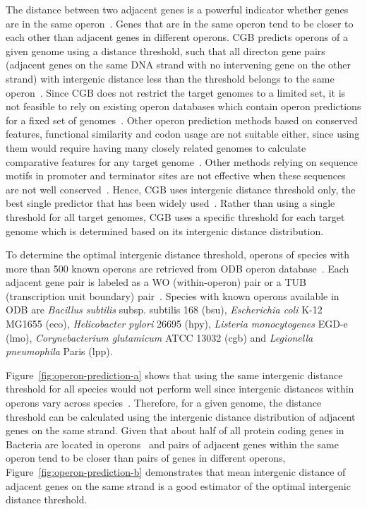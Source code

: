 \documentclass[12pt]{article}
\begin{document}
The distance between two adjacent genes is a powerful indicator whether genes
are in the same operon~\cite{westover2005operon}. Genes that are in the same
operon tend to be closer to each other than adjacent genes in different
operons. CGB predicts operons of a given genome using a distance threshold,
such that all directon gene pairs (adjacent genes on the same DNA strand with
no intervening gene on the other strand) with intergenic distance less than the
threshold belongs to the same operon~\cite{salgado2000operons,
  moreno2002powerful, price2005novel}. Since CGB does not restrict the target
genomes to a limited set, it is not feasible to rely on existing operon
databases which contain operon predictions for a fixed set of
genomes~\cite{mao2009door, taboada2012proopdb, pertea2009operondb}. Other
operon prediction methods based on conserved features, functional similarity
and codon usage are not suitable either, since using them would require having
many closely related genomes to calculate comparative features for any target
genome~\cite{chuang2012features}. Other methods relying on sequence motifs in
promoter and terminator sites are not effective when these sequences are not
well conserved~\cite{salgado2000operons, itoh1999evolutionary}. Hence, CGB uses
intergenic distance threshold only, the best single predictor that has been
widely used~\cite{chuang2012features, westover2005operon}. Rather than using a
single threshold for all target genomes, CGB uses a specific threshold for each
target genome which is determined based on its intergenic distance distribution.

To determine the optimal intergenic distance threshold, operons of species with
more than 500 known operons are retrieved from ODB operon
database~\cite{okuda2006odb}. Each adjacent gene pair is labeled as a WO
(within-operon) pair or a TUB (transcription unit boundary)
pair~\cite{chen2004computational}. Species with known operons available in ODB
are \textit{Bacillus subtilis} subsp. subtilis 168 (bsu), \textit{Escherichia
  coli} K-12 MG1655 (eco), \textit{Helicobacter pylori} 26695 (hpy),
\textit{Listeria monocytogenes} EGD-e (lmo), \textit{Corynebacterium
  glutamicum} ATCC 13032 (cgb) and \textit{Legionella pneumophila} Paris (lpp).

Figure~\ref{fig:operon-prediction-a} shows that using the same intergenic
distance threshold for all species would not perform well since intergenic
distances within operons vary across
species~\cite{rogozin2002congruent}. Therefore, for a given genome, the
distance threshold can be calculated using the intergenic distance distribution
of adjacent genes on the same strand. Given that about half of all protein
coding genes in Bacteria are located in operons~\cite{price2006life} and pairs
of adjacent genes within the same operon tend to be closer than pairs of genes
in different operons, Figure~\ref{fig:operon-prediction-b} demonstrates that
mean intergenic distance of adjacent genes on the same strand is a good
estimator of the optimal intergenic distance threshold.
\end{document}
